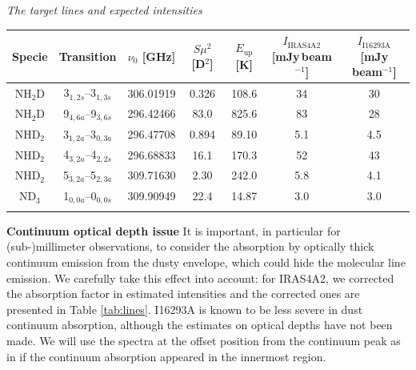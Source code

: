 \documentclass[12pt,a4paper]{article}  %
\begin{document}

\vspace{-1.2em}
\begin{center}
\begin{threeparttable}[tbh]
\caption[]{\emph{The target lines and expected intensities}}
\begin{tabular}{ccccccc}
\hline \hline \noalign {\smallskip}
Specie & Transition & $\nu_0$ [GHz] & $S\mu^2$ [D$^{2}$] & $E_\mathrm{up}$ [K] & $I_\mathrm{IRAS4A2}$ [mJy\,beam$^{-1}$] & $I_\mathrm{I16293A}$ [mJy beam$^{-1}$] \\
\hline \noalign {\smallskip}
NH$_2$D & 3$_{1,2s}$--3$_{1,3s}$ & 306.01919 & 0.326 & 108.6 & 34 & 30 \\
NH$_2$D & 9$_{4,6a}$--9$_{3,6s}$ & 296.42466 & 83.0 & 825.6 & 83 & 28 \\
NHD$_2$ & 3$_{1,2a}$--3$_{0,3a}$ & 296.47708 & 0.894 & 89.10 & 5.1 & 4.5 \\
NHD$_2$ & 4$_{3,2a}$--4$_{2,2s}$ & 296.68833 & 16.1 & 170.3 & 52 & 43\\
NHD$_2$ & 5$_{3,2a}$--5$_{2,3a}$ & 309.71630 & 2.30 & 242.0 & 5.8 & 4.1\\
ND$_3$ & 1$_{0,0a}$--0$_{0,0s}$ & 309.90949	& 22.4 & 14.87 & 3.0 & 3.0 \\
\hline \noalign {\smallskip}
\end{tabular}
\label{tab:lines}
\end{threeparttable}
\end{center}

\smallskip
\noindent \textbf{Continuum optical depth issue} \quad It is important, in particular for (sub-)millimeter observations, to consider the absorption by optically thick continuum emission from the dusty envelope, which could hide the molecular line emission. We carefully take this effect into account: for IRAS4A2, we corrected the absorption factor \citep[$e^{-\tau_\mathrm{c}}$ where $\tau_\mathrm{c}\sim0.6$ is the dust optical depth at $\sim$300\,GHz;][ with assuming an opacity slope of $\beta=1$]{DeSimone20} in estimated intensities and the corrected ones are presented in Table \ref{tab:lines}. I16293A is known to be less severe in dust continuum absorption, although the estimates on optical depths have not been made. We will use the spectra at the offset position from the continuum peak as in \citet{Manigand20} if the continuum absorption appeared in the innermost region.
\end{document}
